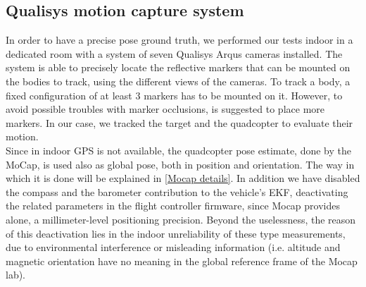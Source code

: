 \subsection{Qualisys motion capture system}
In order to have a precise pose ground truth, we performed our tests indoor in a dedicated room with a system of seven Qualisys Arqus cameras installed. The system is able to precisely locate the reflective markers that can be mounted on the bodies to track, using the different views of the cameras. To track a body, a fixed configuration of at least 3 markers has to be mounted on it. However, to avoid possible troubles with marker occlusions, is suggested to place more markers. In our case, we tracked the target and the quadcopter to evaluate their motion. \\
Since in indoor GPS is not available, the quadcopter pose estimate, done by the MoCap, is used also as global pose, both in position and orientation. The way in which it is done will be explained in \autoref{Mocap details}. In addition we have disabled the compass and the barometer contribution to the vehicle's EKF, deactivating the related parameters in the flight controller firmware, since Mocap provides alone, a millimeter-level positioning precision. Beyond the uselessness, the reason of this deactivation lies in the indoor unreliability of these type measurements, due to environmental interference or misleading information (i.e. altitude and magnetic orientation have no meaning in the global reference frame of the Mocap lab).